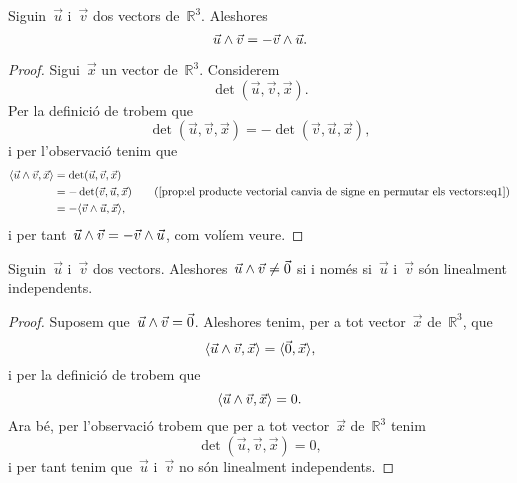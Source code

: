 \documentclass[../../Main.tex]{subfiles}
\begin{document}
	\begin{proposition}
	\label{prop:el producte vectorial canvia de signe en permutar els vectors}
		Siguin~\(\vec{u}\) i~\(\vec{v}\) dos vectors de~\(\mathbb{R}^{3}\).
		Aleshores
		\[
		    \vec{u}\mathbin{\wedge}\vec{v}=-\vec{v}\mathbin{\wedge}\vec{u}.
		\]
		\begin{proof}
			Sigui~\(\vec{x}\) un vector de~\(\mathbb{R}^{3}\).
			Considerem
			\[
			    \det(\vec{u},\vec{v},\vec{x}).
			\]
			Per la definició de  trobem que %
			\begin{equation}
				\label{prop:el producte vectorial canvia de signe en permutar els vectors:eq1}
				\det(\vec{u},\vec{v},\vec{x})=-\det(\vec{v},\vec{u},\vec{x}),
			\end{equation}
			i per l'observació  tenim que
			\begin{align*}
				\prodesc{\vec{u}\prodvec\vec{v}}{\vec{x}}&=\det(\vec{u},\vec{v},\vec{x}) \\
				&=-\det(\vec{v},\vec{u},\vec{x}) \tag{\ref{prop:el producte vectorial canvia de signe en permutar els vectors:eq1}}\\
				&=-\prodesc{\vec{v}\prodvec\vec{u}}{\vec{x}},
			\end{align*}
			i per tant~\(\vec{u}\mathbin{\wedge}\vec{v}=-\vec{v}\mathbin{\wedge}\vec{u}\), com volíem veure.
		\end{proof}
	\end{proposition}
	\begin{proposition}
		\label{prop:el producte vectorial és zero si i només si els vectors no són linealment independents}
		Siguin~\(\vec{u}\) i~\(\vec{v}\) dos vectors.
		Aleshores~\(\vec{u}\mathbin{\wedge}\vec{v}\neq\vec{0}\) si i només si~\(\vec{u}\) i~\(\vec{v}\) són linealment independents.
		\begin{proof}
			Suposem que~\(\vec{u}\mathbin{\wedge}\vec{v}=\vec{0}\).
			Aleshores tenim, per a tot vector~\(\vec{x}\) de~\(\mathbb{R}^{3}\), que
			\[
			    \prodesc{\vec{u}\prodvec\vec{v}}{\vec{x}}=\prodesc{\vec{0}}{\vec{x}},
			\]
			i per la definició de  trobem que
			\[
			    \prodesc{\vec{u}\prodvec\vec{v}}{\vec{x}}=0.
			\]
			Ara bé, per l'observació  trobem que per a tot vector~\(\vec{x}\) de~\(\mathbb{R}^{3}\) tenim
			\[
			    \det(\vec{u},\vec{v},\vec{x})=0,
			\]
			i per tant tenim que~\(\vec{u}\) i~\(\vec{v}\) no són linealment independents.
		\end{proof}
	\end{proposition}
\end{document}
